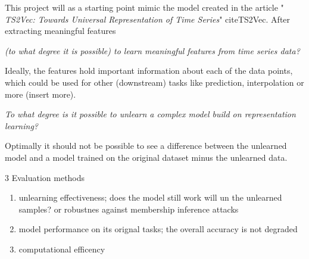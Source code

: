 









This project will as a starting point mimic the model created in the article "\textit{
TS2Vec: Towards Universal Representation of Time Series}" cite{TS2Vec}. After extracting meaningful features  



\textit{(to what degree it is possible) to learn meaningful features from time series data?}

Ideally, the features hold important information about each of the data points, which could be used for other (downstream) tasks like prediction, interpolation or more (insert more). 

\textit{To what degree is it possible to unlearn a complex model build on representation learning?}

Optimally it should not be possible to see a difference between the unlearned model and a model trained on the original dataset minus the unlearned data. 






3 Evaluation methods
\begin{enumerate}
\item unlearning effectiveness; does the model still work will un the unlearned samples? or robustnes against membership inference attacks
\item model performance on its orignal tasks; the overall accuracy is not degraded
\item computational efficency
\end{enumerate}



